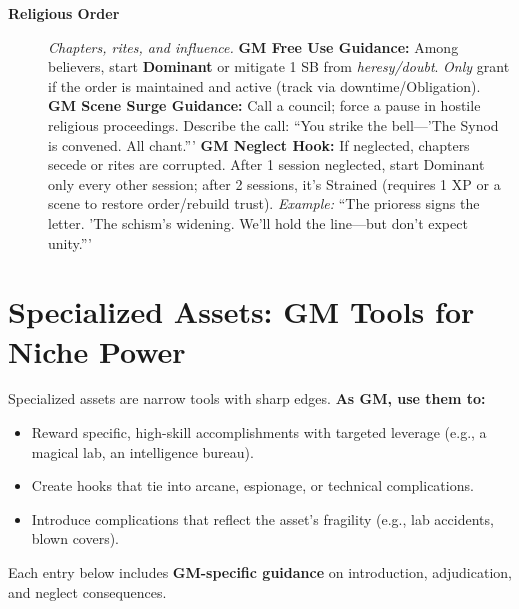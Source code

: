\begin{description}
  \item[\textbf{Religious Order}]   
        \emph{Chapters, rites, and influence.}  
        \textbf{GM Free Use Guidance:} Among believers, start \textbf{Dominant} or mitigate 1 SB from \emph{heresy/doubt}. \emph{Only} grant if the order is maintained and active (track via downtime/Obligation).  
        \textbf{GM Scene Surge Guidance:} Call a council; force a pause in hostile religious proceedings. Describe the call: ``You strike the bell---'The Synod is convened. All chant.'''  
        \textbf{GM Neglect Hook:} If neglected, chapters secede or rites are corrupted. After 1 session neglected, start Dominant only every other session; after 2 sessions, it's Strained (requires 1 XP or a scene to restore order/rebuild trust).  
        \textit{Example:} ``The prioress signs the letter. 'The schism's widening. We'll hold the line---but don't expect unity.'''  
\end{description}

\section{Specialized Assets: GM Tools for Niche Power}
\label{sec:specialized-assets}
Specialized assets are narrow tools with sharp edges. \textbf{As GM, use them to:}  
\begin{itemize}
  \item Reward specific, high-skill accomplishments with targeted leverage (e.g., a magical lab, an intelligence bureau).  
  \item Create hooks that tie into arcane, espionage, or technical complications.  
  \item Introduce complications that reflect the asset's fragility (e.g., lab accidents, blown covers).  
\end{itemize}
Each entry below includes \textbf{GM-specific guidance} on introduction, adjudication, and neglect consequences.

